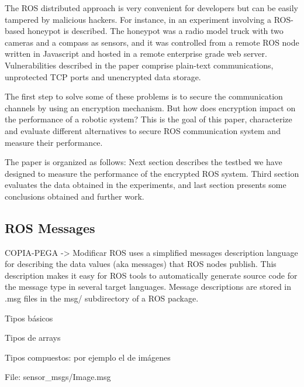 \documentclass[journal,twoside]{JoPhA}
\begin{document}

The ROS distributed approach is very convenient for developers but can be easily tampered by malicious hackers. For instance, in \cite{McClean2013} an experiment involving a ROS-based honeypot is described. The honeypot was a radio model truck with two cameras and a compass as sensors, and it was controlled from a remote ROS node written in Javascript and hosted in a remote enterprise grade web server. Vulnerabilities described in the paper comprise plain-text communications, unprotected TCP ports and unencrypted data storage.

The first step to solve some of these problems is to secure the communication channels by using an encryption mechanism. But how does encryption impact on the performance of a robotic system? This is the goal of this paper, characterize and evaluate different alternatives to secure ROS communication system and measure their performance.


The paper is organized as follows: Next section describes the testbed we have designed to measure the performance of the encrypted ROS system. Third section evaluates the data obtained in the experiments, and last section presents some conclusions obtained and further work.

\subsection{ROS Messages}

{\color{red} COPIA-PEGA -> Modificar}
ROS uses a simplified messages description language for describing the data values (aka messages) that ROS nodes publish. This description makes it easy for ROS tools to automatically generate source code for the message type in several target languages. Message descriptions are stored in .msg files in the msg/ subdirectory of a ROS package. 

Tipos básicos

Tipos de arrays

Tipos compuestos: por ejemplo el de imágenes

File: sensor\_msgs/Image.msg
\end{document}
